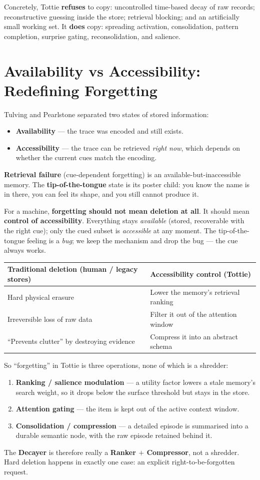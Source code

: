 \noindent Concretely, Tottie \textbf{refuses} to copy: uncontrolled time-based decay of raw records;
reconstructive guessing inside the store; retrieval blocking; and an artificially small working set.
It \textbf{does} copy: spreading activation, consolidation, pattern completion, surprise gating,
reconsolidation, and salience.

\section{Availability vs Accessibility: Redefining Forgetting}
Tulving and Pearlstone separated two states of stored information:
\begin{itemize}
  \item \textbf{Availability} --- the trace was encoded and still exists.
  \item \textbf{Accessibility} --- the trace can be retrieved \emph{right now}, which depends on
  whether the current cues match the encoding.
\end{itemize}
\textbf{Retrieval failure} (cue-dependent forgetting) is an available-but-inaccessible memory. The
\textbf{tip-of-the-tongue} state is its poster child: you know the name is in there, you can feel its
shape, and you still cannot produce it.

For a machine, \textbf{forgetting should not mean deletion at all}. It should mean \textbf{control of
accessibility}. Everything stays \emph{available} (stored, recoverable with the right cue); only the
cued subset is \emph{accessible} at any moment. The tip-of-the-tongue feeling is a \emph{bug}; we keep
the mechanism and drop the bug --- the cue always works.

\begin{longtable}{@{}p{}p{}@{}}
\toprule
Traditional deletion (human / legacy stores) & Accessibility control (Tottie) \\
\midrule
Hard physical erasure & Lower the memory's retrieval ranking \\
Irreversible loss of raw data & Filter it out of the attention window \\
``Prevents clutter'' by destroying evidence & Compress it into an abstract schema \\
\bottomrule
\end{longtable}

So ``forgetting'' in Tottie is three operations, none of which is a shredder:
\begin{enumerate}
  \item \textbf{Ranking / salience modulation} --- a utility factor lowers a stale memory's search
  weight, so it drops below the surface threshold but stays in the store.
  \item \textbf{Attention gating} --- the item is kept out of the active context window.
  \item \textbf{Consolidation / compression} --- a detailed episode is summarised into a durable
  semantic node, with the raw episode retained behind it.
\end{enumerate}
The \textbf{Decayer} is therefore really a \textbf{Ranker $+$ Compressor}, not a shredder. Hard
deletion happens in exactly one case: an explicit right-to-be-forgotten request.

